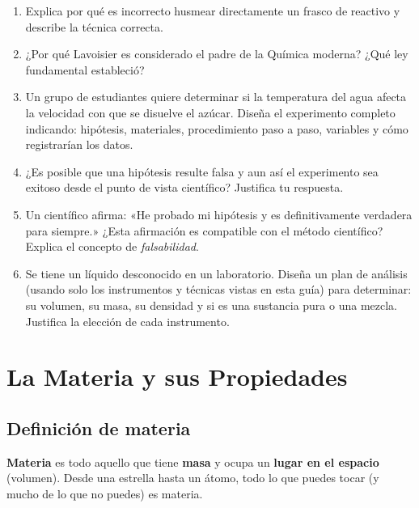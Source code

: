 \documentclass[12pt, letterpaper]{article}
\begin{document}
\begin{enumerate}[leftmargin=*]
  \item \medio{} Explica por qué es incorrecto husmear directamente un frasco de reactivo y describe la técnica correcta.

  \item \medio{} ¿Por qué Lavoisier es considerado el padre de la Química moderna? ¿Qué ley fundamental estableció?

  \item \dificil{} Un grupo de estudiantes quiere determinar si la temperatura del agua afecta la velocidad con que se disuelve el azúcar. Diseña el experimento completo indicando: hipótesis, materiales, procedimiento paso a paso, variables y cómo registrarían los datos.

  \item \dificil{} ¿Es posible que una hipótesis resulte falsa y aun así el experimento sea exitoso desde el punto de vista científico? Justifica tu respuesta.

  \item \dificil{} Un científico afirma: «He probado mi hipótesis y es definitivamente verdadera para siempre.» ¿Esta afirmación es compatible con el método científico? Explica el concepto de \emph{falsabilidad}.

  \item \dificil{} Se tiene un líquido desconocido en un laboratorio. Diseña un plan de análisis (usando solo los instrumentos y técnicas vistas en esta guía) para determinar: su volumen, su masa, su densidad y si es una sustancia pura o una mezcla. Justifica la elección de cada instrumento.
\end{enumerate}

\newpage

\section{La Materia y sus Propiedades}

\subsection{Definición de materia}

\begin{cuadroteoria}
  \textbf{Materia} es todo aquello que tiene \textbf{masa} y ocupa un \textbf{lugar en el espacio} (volumen). Desde una estrella hasta un átomo, todo lo que puedes tocar (y mucho de lo que no puedes) es materia.
\end{cuadroteoria}
\end{document}
